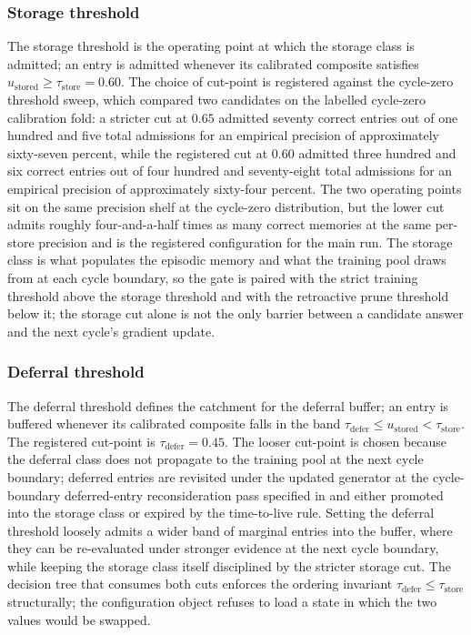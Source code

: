 \subsubsection{Storage threshold}
\label{sec:conformal-store}

The storage threshold is the operating point at which the storage class is admitted; an entry is admitted whenever its calibrated composite satisfies $u_{\text{stored}} \ge \tau_{\text{store}} = 0.60$. The choice of cut-point is registered against the cycle-zero threshold sweep, which compared two candidates on the labelled cycle-zero calibration fold: a stricter cut at $0.65$ admitted seventy correct entries out of one hundred and five total admissions for an empirical precision of approximately sixty-seven percent, while the registered cut at $0.60$ admitted three hundred and six correct entries out of four hundred and seventy-eight total admissions for an empirical precision of approximately sixty-four percent. The two operating points sit on the same precision shelf at the cycle-zero distribution, but the lower cut admits roughly four-and-a-half times as many correct memories at the same per-store precision and is the registered configuration for the main run. The storage class is what populates the episodic memory and what the training pool draws from at each cycle boundary, so the gate is paired with the strict training threshold above the storage threshold and with the retroactive prune threshold below it; the storage cut alone is not the only barrier between a candidate answer and the next cycle's gradient update.

\subsubsection{Deferral threshold}
\label{sec:conformal-defer}

The deferral threshold defines the catchment for the deferral buffer; an entry is buffered whenever its calibrated composite falls in the band $\tau_{\text{defer}} \le u_{\text{stored}} < \tau_{\text{store}}$. The registered cut-point is $\tau_{\text{defer}} = 0.45$. The looser cut-point is chosen because the deferral class does not propagate to the training pool at the next cycle boundary; deferred entries are revisited under the updated generator at the cycle-boundary deferred-entry reconsideration pass specified in  and either promoted into the storage class or expired by the time-to-live rule. Setting the deferral threshold loosely admits a wider band of marginal entries into the buffer, where they can be re-evaluated under stronger evidence at the next cycle boundary, while keeping the storage class itself disciplined by the stricter storage cut. The decision tree that consumes both cuts enforces the ordering invariant $\tau_{\text{defer}} \le \tau_{\text{store}}$ structurally; the configuration object refuses to load a state in which the two values would be swapped.

